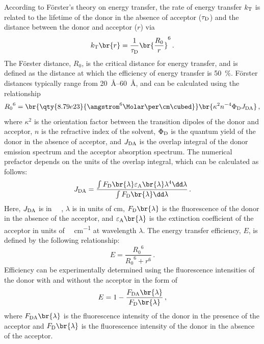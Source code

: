 \documentclass[nobib,nofonts,nols,nohyper]{tufte-handout}
\begin{document}
According to Förster’s theory on energy transfer, the rate of energy transfer \( k_{\textnormal{T}} \) is related to the lifetime of the donor in the absence of acceptor (\( \tau_{\textnormal{D}} \)) and the distance between the donor and acceptor (\( r \)) via
\begin{equation}
	k_\mtext{T}\br{r} = \frac{1}{\tau_\mtext{D}} \br{\frac{R_0}{r}}^6 \, .
\end{equation}
The Förster distance, \( R_0 \), is the critical distance for energy transfer, and is defined as the distance at which the efficiency of energy transfer is \qty{50}{\percent}. 
Förster distances typically range from \qtyrange{20}{60}{\angstrom}, and can be calculated using the relationship
\begin{equation}
	{R_0}^6 = \br{\qty{8.79e23}{\angstrom^6\Molar\per\cm\cubed}}
							\br{\kappa^2 n^{-4} \Phi_\mtext{D} J_\mtext{DA}} \, ,
  \label{eq:forster_dist}
\end{equation}
where \( \kappa^2 \) is the orientation factor between the transition dipoles of the donor and acceptor, \( n \) is the refractive index of the solvent, \( \Phi_{\textnormal{D}} \) is the quantum yield of the donor in the absence of acceptor, and \( J_{\textnormal{DA}} \) is the overlap integral of the donor emission spectrum and the acceptor absorption spectrum. 
The numerical prefactor depends on the units of the overlap integral, which can be calculated as follows:
\begin{equation}
	J_\mtext{DA} = \frac{\int F_\mtext{D}\br{\lambda}
											 \varepsilon_\mtext{A}\br{\lambda} 
											 \lambda^4 \dd\lambda}
											{\int F_\mtext{D}\br{\lambda}\dd\lambda} \, .
  \label{eq:overlap_int}
\end{equation}
Here, \( J_{\textnormal{DA}} \) is in \unit{\per\Molar\cmc}, \( \lambda \) is in units of \unit{\cm}, \( F_\mtext{D}\br{\lambda} \) is the fluorescence of the donor in the absence of the acceptor, and \( \varepsilon_\mtext{A}\br{\lambda} \) is the extinction coefficient of the acceptor in units of \unit{\per\Molar\per\cm} at wavelength \( \lambda \). The energy transfer efficiency, \( E \), is defined by the following relationship:
\begin{equation}
	E = \frac{{R_0}^6}{{R_0}^6 + r^6} \, .
	\label{eq:dist_efficiency}
\end{equation}
Efficiency can be experimentally determined using the fluorescence intensities of the donor with and without the acceptor in the form of
\begin{equation}
	E = 1 - \frac{F_\mtext{DA}\br{\lambda}}{F_\mtext{D}\br{\lambda}} \, ,
	\label{eq:spec_efficiency}
\end{equation}
where \( F_\mtext{DA}\br{\lambda} \) is the fluorescence intensity of the donor in the presence of the acceptor and \( F_\mtext{D}\br{\lambda} \) is the fluorescence intensity of the donor in the absence of the acceptor. 
\end{document}
